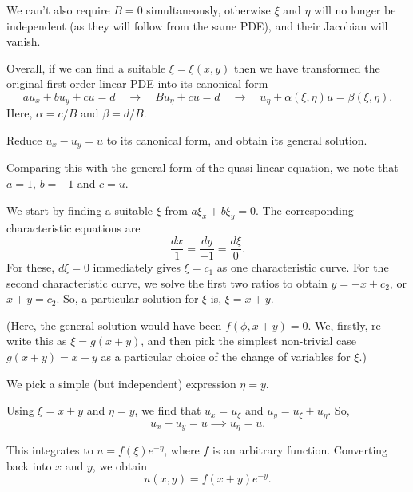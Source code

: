 \documentclass[11pt]{penrose}
\begin{document}
We can't also require $B = 0$ simultaneously, otherwise $\xi$ and $\eta$ will no longer be independent (as they will follow from the same PDE), and their Jacobian will vanish.

Overall, if we can find a suitable $\xi = \xi(x,y)$ then we have transformed the original first order linear PDE into its canonical form
\begin{equation}
    a u_x + b u_y + c u = d
    \quad\to\quad B u_\eta + cu = d
    \quad\to\quad u_\eta + \alpha(\xi, \eta) u = \beta(\xi, \eta).
\end{equation}
Here, $\alpha = c/B$ and $\beta = d/B$.

\begin{negg}
    Reduce $u_x - u_y = u$ to its canonical form, and obtain its general solution.

    Comparing this with the general form of the quasi-linear equation, we note that $a = 1$, $b = -1$ and $c = u$.

    We start by finding a suitable $\xi$ from $a \xi_x + b \xi_y = 0$. The corresponding characteristic equations are
    \begin{equation*}
        \frac{dx}{1} = \frac{dy}{-1} = \frac{d\xi}{0}.
    \end{equation*}
    For these, $d\xi = 0$ immediately gives $\xi = c_1$ as one characteristic curve. For the second characteristic curve, we solve the first two ratios to obtain $y = -x + c_2$, or $x + y = c_2$. So, a particular solution for $\xi$ is, $\xi = x+y$.

    (Here, the general solution would have been $f(\phi, x+y) = 0$. We, firstly, re-write this as $\xi = g(x+y)$, and then pick the simplest non-trivial case $g(x+y) = x+y$ as a particular choice of the change of variables for $\xi$.)

    We pick a simple (but independent) expression $\eta = y$.

    Using $\xi = x+y$ and $\eta = y$, we find that $u_x = u_\xi$ and $u_y = u_\xi + u_\eta$. So,
    \begin{equation}
        u_x - u_y = u
        \implies
        u_\eta = u.
    \end{equation}

    This integrates to $u = f(\xi) e^{-\eta}$, where $f$ is an arbitrary function. Converting back into $x$ and $y$, we obtain
    \begin{equation}
        u(x, y) = f(x+y) e^{-y}.
    \end{equation}
\end{negg}
\end{document}
